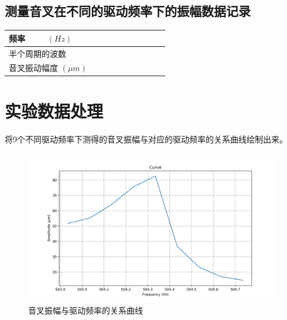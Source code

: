 \documentclass{ctexart}
\begin{document}
\subsection{测量音叉在不同的驱动频率下的振幅数据记录}

\begin{table}[h]
    \renewcommand\arraystretch{1.2}
    \centering
    \begin{tabular}{|m{2cm}<{\centering}|m{0.8cm}<{\centering}|m{0.8cm}<{\centering}|m{0.8cm}<{\centering}|m{0.8cm}<{\centering}|m{0.8cm}<{\centering}|m{0.8cm}<{\centering}|m{0.8cm}<{\centering}|m{0.8cm}<{\centering}|m{0.8cm}<{\centering}|}
        \hline
        频率  \ \ \ \ $(Hz)$ \ \  & & & & & & & & & \\
        \hline
        半个周期的波数 & & & & & & & & & \\
        \hline
        音叉振动幅度 $(\mu m)$ & & & & & & & & & \\
        \hline
    \end{tabular}
\end{table}


\newpage

\section{实验数据处理}

将9个不同驱动频率下测得的音叉振幅与对应的驱动频率的关系曲线绘制出来。

\begin{figure}[!h]
    \centering
    \includegraphics[width=\textwidth]{./curve.png}
    \caption{音叉振幅与驱动频率的关系曲线}
\end{figure}
\end{document}
